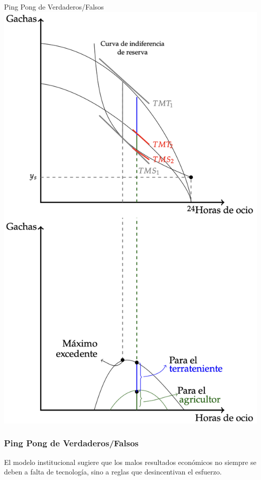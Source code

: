 \documentclass{beamer}
\begin{document}
\begin{frame}{Ping Pong de Verdaderos/Falsos}
    \centering
    \includegraphics[scale=0.28]{../Figures/C19.15.jpg}
\end{frame}

\begin{frame}
\frametitle{Ping Pong de Verdaderos/Falsos}
    \centering
    El modelo institucional sugiere que los malos resultados económicos no siempre se deben a falta de tecnología, sino a reglas que desincentivan el esfuerzo.
\end{frame}
\end{document}
